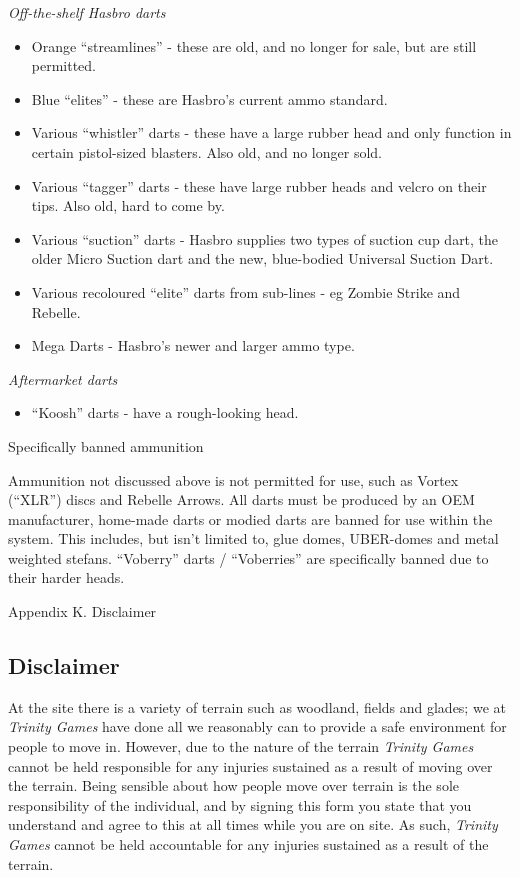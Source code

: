 \textit{Off-the-shelf Hasbro darts}

\begin{itemize}
\item Orange ``streamlines'' - these are old, and no longer for sale, but are still permitted.

\item Blue ``elites'' - these are Hasbro's current ammo standard.

\item Various ``whistler'' darts - these have a large rubber head and only function in certain pistol-sized blasters. Also old, and no longer sold.

\item Various ``tagger'' darts - these have large rubber heads and velcro on their tips. Also old, hard to come by.

\item Various ``suction'' darts - Hasbro supplies two types of suction cup dart, the older Micro Suction dart and the new, blue-bodied Universal Suction Dart.

\item Various recoloured ``elite'' darts from sub-lines - eg Zombie Strike and Rebelle.

\item Mega Darts - Hasbro's newer and larger ammo type.

\end{itemize}
\textit{Aftermarket darts}

\begin{itemize}
\item ``Koosh'' darts - have a rough-looking head.

\end{itemize}
Specifically banned ammunition

Ammunition not discussed above is not permitted for use, such as Vortex (``XLR'') discs and Rebelle Arrows. All darts must be produced by an OEM manufacturer, home-made darts or modied darts are banned for use within the system. This includes, but isn't limited to, glue domes, UBER-domes and metal weighted stefans. ``Voberry'' darts / ``Voberries'' are specifically banned due to their harder heads.

Appendix K. Disclaimer

\subsection{Disclaimer}

At the site there is a variety of terrain such as woodland, fields and glades; we at \textit{Trinity Games} have done all we reasonably can to provide a safe environment for people to move in. However, due to the nature of the terrain \textit{Trinity Games} cannot be held responsible for any injuries sustained as a result of moving over the terrain. Being sensible about how people move over terrain is the sole responsibility of the individual, and by signing this form you state that you understand and agree to this at all times while you are on site. As such, \textit{Trinity Games} cannot be held accountable for any injuries sustained as a result of the terrain.

